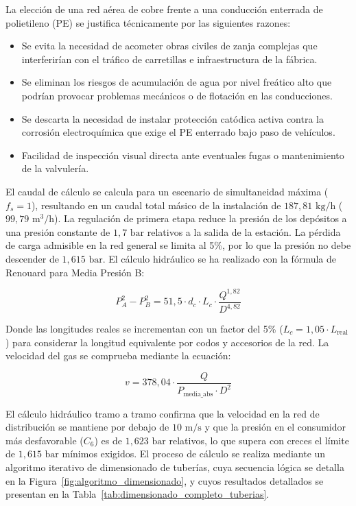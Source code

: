 \documentclass[12pt]{article}
\begin{document}
        La elección de una red aérea de cobre frente a una conducción enterrada de polietileno (PE) se justifica técnicamente por las siguientes razones:
        \begin{itemize}
            \item Se evita la necesidad de acometer obras civiles de zanja complejas que interferirían con el tráfico de carretillas e infraestructura de la fábrica.
            \item Se eliminan los riesgos de acumulación de agua por nivel freático alto que podrían provocar problemas mecánicos o de flotación en las conducciones.
            \item Se descarta la necesidad de instalar protección catódica activa contra la corrosión electroquímica que exige el PE enterrado bajo paso de vehículos.
            \item Facilidad de inspección visual directa ante eventuales fugas o mantenimiento de la valvulería.
        \end{itemize}
        
        El caudal de cálculo se calcula para un escenario de simultaneidad máxima ($f_s=1$), resultando en un caudal total másico de la instalación de $187,81\text{ kg/h}$ ($99,79\text{ m}^3\text{/h}$). La regulación de primera etapa reduce la presión de los depósitos a una presión constante de $1,7\text{ bar}$ relativos a la salida de la estación. La pérdida de carga admisible en la red general se limita al 5\%, por lo que la presión no debe descender de $1,615\text{ bar}$. El cálculo hidráulico se ha realizado con la fórmula de Renouard para Media Presión B:
        
        \begin{equation}
            P_A^2 - P_B^2 = 51,5 \cdot d_c \cdot L_c \cdot \frac{Q^{1,82}}{D^{4,82}}
        \end{equation}
        
        Donde las longitudes reales se incrementan con un factor del 5\% ($L_c = 1,05 \cdot L_{\text{real}}$) para considerar la longitud equivalente por codos y accesorios de la red. La velocidad del gas se comprueba mediante la ecuación:
        
        \begin{equation}
            v = 378,04 \cdot \frac{Q}{P_{\text{media\_abs}} \cdot D^2}
        \end{equation}
        
        El cálculo hidráulico tramo a tramo confirma que la velocidad en la red de distribución se mantiene por debajo de $10\text{ m/s}$ y que la presión en el consumidor más desfavorable ($C_6$) es de $1,623\text{ bar}$ relativos, lo que supera con creces el límite de $1,615\text{ bar}$ mínimos exigidos. El proceso de cálculo se realiza mediante un algoritmo iterativo de dimensionado de tuberías, cuya secuencia lógica se detalla en la Figura~\ref{fig:algoritmo_dimensionado}, y cuyos resultados detallados se presentan en la Tabla~\ref{tab:dimensionado_completo_tuberias}.
\end{document}
